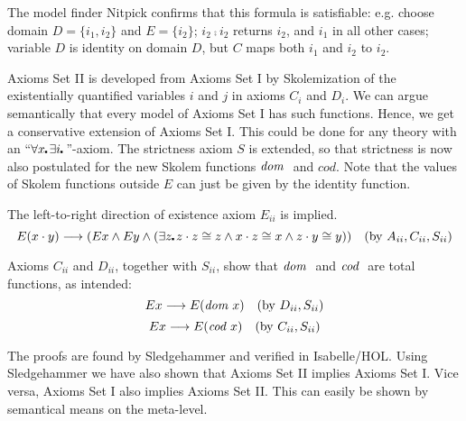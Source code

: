 The model finder Nitpick confirms that this formula is satisfiable:
e.g. choose domain $D=\{i_1,i_2\}$ and $E=\{i_2\}$; $i_2\comp i_2$ returns $i_2$,  and $i_1$
in all other cases; variable $D$ is identity on domain $D$, but $C$ maps both
$i_1$ and $i_2$ to $i_2$. 


Axioms Set II is developed from Axioms Set I by Skolemization of the
existentially quantified variables $i$ and $j$ in axioms $C_i$ and
$D_i$. We can argue semantically that every model of Axioms Set I has
such functions. Hence, we get a conservative extension of Axioms Set
I. This could be done for any theory with an ``$\forall x\lambdot \exists i\lambdot$''-axiom. The strictness axiom $S$ is extended, so
that strictness is now also postulated for the new Skolem functions
$\textit{dom \/}$ and $cod$. Note that the values of Skolem functions
outside $E$ can just be given by the identity function.

The left-to-right direction of existence axiom $E_{ii}$ is implied. 
  $$E(x \comp y) \imp (E x \wedge E y \wedge (\exists z\lambdot z \comp z
  \cong z \wedge x \comp z \cong x \wedge z\comp y \cong y)) \quad
  (\text{by } A_{ii}, C_{ii}, S_{ii})$$

Axioms $C_{ii}$ and $D_{ii}$, together with $S_{ii}$, show that
${\textit{dom \/}}$ and ${\textit{cod \/}}$ are total functions, as intended: 
$$E x \longrightarrow E(\textit{dom \/} x) \quad (\text{by } D_{ii}, S_{ii})$$
$$E x \longrightarrow E(\textit{cod \/} x) \quad (\text{by } C_{ii}, S_{ii}) $$

The proofs are found by Sledgehammer and verified in Isabelle/HOL. Using Sledgehammer we have also
shown that Axioms Set II implies Axioms Set I. Vice versa, Axioms Set I
also implies Axioms Set II. This can easily 
be shown by semantical means on the meta-level.

